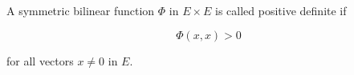 A symmetric bilinear function $\Phi$ in $E \times E$ is called positive definite if

$$\Phi(x, x) > 0$$

for all vectors $x \neq 0$ in $E$.
